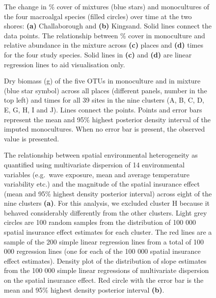 \documentclass[
  letterpaper,
  DIV=11,
  numbers=noendperiod]{scrartcl}
\begin{document}
\begin{figure}


\caption{\label{fig-s1}The change in \% cover of mixtures (blue stars)
and monocultures of the four macroalgal species (filled circles) over
time at the two shores: \textbf{(a)} Challaborough and \textbf{(b)}
Kingsand. Solid lines connect the data points. The relationship between
\% cover in monoculture and relative abundance in the mixture across
\textbf{(c)} places and \textbf{(d)} times for the four study species.
Solid lines in \textbf{(c)} and \textbf{(d)} are linear regression lines
to aid visualisation only.}

\end{figure}%

\begin{figure}


\caption{\label{fig-s2}Dry biomass (g) of the five OTUs in monoculture
and in mixture (blue star symbol) across all places (different panels,
number in the top left) and times for all 39 sites in the nine clusters
(A, B, C, D, E, G, H, I and J). Lines connect the points. Points and
error bars represent the mean and 95\% highest posterior density
interval of the imputed monocultures. When no error bar is present, the
observed value is presented.}

\end{figure}%

\begin{figure}


\caption{\label{fig-s3}The relationship between spatial environmental
heterogeneity as quantified using multivariate dispersion of 14
environmental variables (e.g.~wave exposure, mean and average
temperature variability etc.) and the magnitude of the spatial insurance
effect (mean and 95\% highest density posterior interval) across eight
of the nine clusters \textbf{(a)}. For this analysis, we excluded
cluster H because it behaved considerably differently from the other
clusters. Light grey circles are 100 random samples from the
distribution of 100 000 spatial insurance effect estimates for each
cluster. The red lines are a sample of the 200 simple linear regression
lines from a total of 100 000 regression lines (one for each of the 100
000 spatial insurance effect estimates). Density plot of the
distribution of slope estimates from the 100 000 simple linear
regressions of multivariate dispersion on the spatial insurance effect.
Red circle with the error bar is the mean and 95\% highest density
posterior interval \textbf{(b)}.}

\end{figure}%
\end{document}
